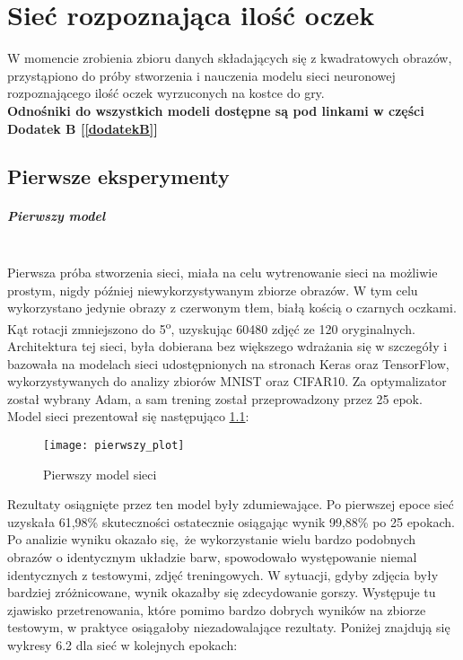 
\chapter{Sieć rozpoznająca ilość oczek}
W momencie zrobienia zbioru danych składających się z kwadratowych obrazów, przystąpiono
do próby stworzenia i nauczenia modelu sieci neuronowej rozpoznającego ilość oczek
wyrzuconych na kostce do gry.\\
\textbf{Odnośniki do wszystkich modeli dostępne są pod linkami w części Dodatek B [\ref{dodatekB}] }

\section{Pierwsze eksperymenty}
\paragraph{Pierwszy model} \mbox{}\\
Pierwsza próba stworzenia sieci, miała
na celu wytrenowanie sieci na możliwie prostym, nigdy później niewykorzystywanym zbiorze obrazów.
W tym celu wykorzystano jedynie obrazy z czerwonym tłem, białą kością o czarnych oczkami.
Kąt rotacji zmniejszono do 5\textsuperscript{o}, uzyskując 60480 zdjęć ze 120 oryginalnych.\\
Architektura tej sieci, była dobierana bez większego wdrażania się w szczegóły i
bazowała na modelach sieci udostępnionych na stronach Keras oraz TensorFlow,
wykorzystywanych do analizy zbiorów MNIST oraz CIFAR10. Za optymalizator został wybrany
Adam, a sam trening został przeprowadzony przez 25 epok.
Model sieci prezentował się następująco \ref{fig:first_model}: \newpage
\begin{figure}[h!]
\centering
\texttt{[image: pierwszy\_plot]}
\caption{Pierwszy model sieci}
\label{fig:first_model}
\end{figure}
Rezultaty osiągnięte przez ten model były zdumiewające. Po pierwszej epoce
sieć uzyskała 61,98\% skuteczności ostatecznie osiągając wynik 99,88\% po 25 epokach.\\
Po analizie wyniku okazało się, że wykorzystanie wielu bardzo podobnych obrazów o identycznym
układzie barw, spowodowało występowanie niemal identycznych z testowymi, zdjęć treningowych.
W sytuacji, gdyby zdjęcia były bardziej zróżnicowane, wynik okazałby się zdecydowanie gorszy.
Występuje tu zjawisko przetrenowania, które pomimo bardzo dobrych wyników na zbiorze testowym,
w praktyce osiągałoby niezadowalające rezultaty. Poniżej znajdują się wykresy 6.2
dla sieć w kolejnych epokach:

